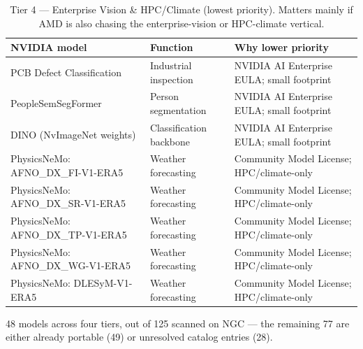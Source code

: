 \documentclass[blind]{gtac}
\begin{document}
\begin{table}[H]
\centering
\caption{Tier 4 --- Enterprise Vision \& HPC/Climate (lowest priority). Matters mainly if AMD is also chasing the enterprise-vision or HPC-climate vertical.}
\label{tab:a4}
\tiny
\begin{tabular}{@{}p{0.85in}p{0.75in}p{0.75in}@{}}
\toprule
NVIDIA model & Function & Why lower priority \\
\midrule
PCB Defect Classification & Industrial inspection & NVIDIA AI Enterprise EULA; small footprint \\
PeopleSemSegFormer & Person segmentation & NVIDIA AI Enterprise EULA; small footprint \\
DINO (NvImageNet weights) & Classification backbone & NVIDIA AI Enterprise EULA; small footprint \\
PhysicsNeMo: AFNO\_DX\_FI-V1-ERA5 & Weather forecasting & Community Model License; HPC/climate-only \\
PhysicsNeMo: AFNO\_DX\_SR-V1-ERA5 & Weather forecasting & Community Model License; HPC/climate-only \\
PhysicsNeMo: AFNO\_DX\_TP-V1-ERA5 & Weather forecasting & Community Model License; HPC/climate-only \\
PhysicsNeMo: AFNO\_DX\_WG-V1-ERA5 & Weather forecasting & Community Model License; HPC/climate-only \\
PhysicsNeMo: DLESyM-V1-ERA5 & Weather forecasting & Community Model License; HPC/climate-only \\
\bottomrule
\end{tabular}
\end{table}

48 models across four tiers, out of 125 scanned on NGC --- the remaining 77 are either already portable (49) or unresolved catalog entries (28).

\begingroup
\let\itshape\upshape


\endgroup
\end{document}
